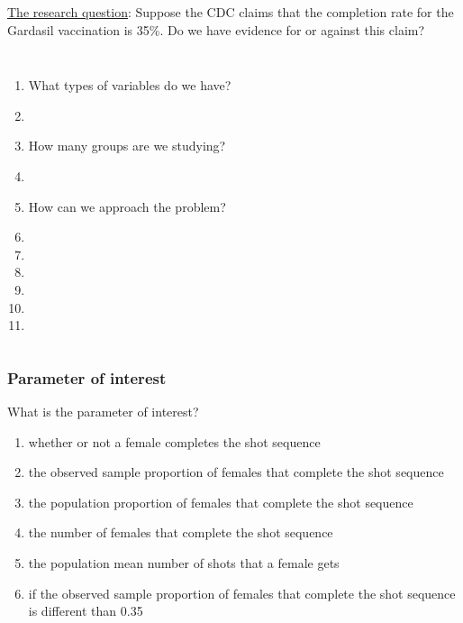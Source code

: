 \begin{frame}[fragile]
\underline{The research question}: Suppose the CDC claims that the completion rate for the Gardasil vaccination is 35\%.  Do we have evidence for or against this claim?
\vskip10pt
\begin{columns}
\begin{enumerate}
\item
What types of variables do we have?
\item[]
\item
How many groups are we studying?
\item[]
\item
How can we approach the problem?
\item[]
\item[]
\item[]
\item[]
\item[]
\item[]
\end{enumerate}
\end{columns}
\end{frame}

\begin{frame}
\frametitle{Parameter of interest}
\begin{clicker}{What is the parameter of interest?}
\begin{enumerate}
    \item
    whether or not a female completes the shot sequence
    \item
    the observed sample proportion of females that complete the shot sequence
    \item
    the population proportion of females that complete the shot sequence
    \item
    the number of females that complete the shot sequence
    \item
    the population mean number of shots that a female gets
    \item
    if the observed sample proportion of females that complete the shot sequence is different than 0.35
\end{enumerate}
\end{clicker}
\end{frame}

